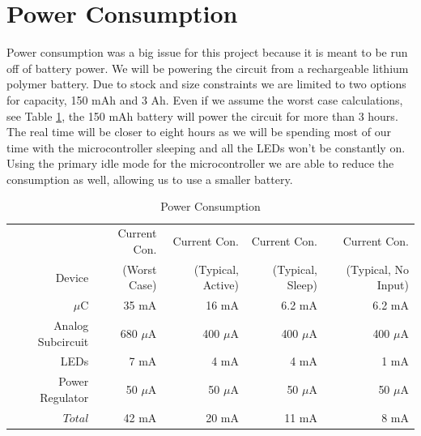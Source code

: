 \documentclass[12pt]{article}
\begin{document}
\section{Power Consumption}
Power consumption was a big issue for this project because it is  meant to be run off of battery power.
 We will be powering the circuit from a rechargeable lithium polymer battery. Due to stock and size constraints
 we are limited to two options for capacity, 150 mAh and 3 Ah. Even if we assume the worst case calculations, 
 see Table \ref{Power}, the 150 mAh battery will power the circuit for more than 3 hours. The real time will be 
 closer to eight hours as we will be spending most of our time with the microcontroller sleeping and all the LEDs
 won't be constantly on. Using the primary idle mode for the microcontroller we are able to reduce the consumption
 as well, allowing us to use a smaller battery.

\begin{table}[!h]
   \centering
    \begin{tabular}{|r|r|r|r|r|}
        \hline
         & Current Con.& Current Con.& Current Con. & Current Con. \\
        Device & (Worst Case)& (Typical, Active)& (Typical, Sleep) & (Typical, No Input) \\ \hline
       $\mu$C \footnotemark & 35 mA & 16 mA & 6.2 mA & 6.2 mA \\ \hline
       Analog Subcircuit \footnotemark & 680 $\mu$A & 400 $\mu$A & 400 $\mu$A & 400 $\mu$A \\ \hline
       LEDs \footnotemark & 7 mA & 4 mA & 4 mA & 1 mA \\ \hline
       Power Regulator \footnotemark & 50 $\mu$A & 50 $\mu$A & 50 $\mu$A & 50 $\mu$A \\ \hline 
       $Total$ & 42 mA & 20 mA & 11 mA & 8 mA\\ \hline 
    \end{tabular}
	\caption{Power Consumption}
	\label{Power} 
\end{table}

\end{document}
